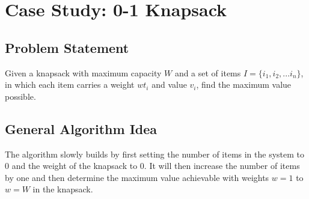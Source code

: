 \section{Case Study: 0-1 Knapsack}

\subsection*{Problem Statement}
Given a knapsack with maximum capacity $W$ and a set of items $I = \{ i_1, i_2, ... i_n \}$, in which each item carries a weight $wt_i$ and value $v_i$, find the maximum value possible.

\subsection*{General Algorithm Idea}
The algorithm slowly builds by first setting the number of items in the system to 0 and the weight of the knapsack to 0. It will then increase the number of items by one and then determine the maximum value achievable with weights $w = 1$ to $w = W$ in the knapsack.

